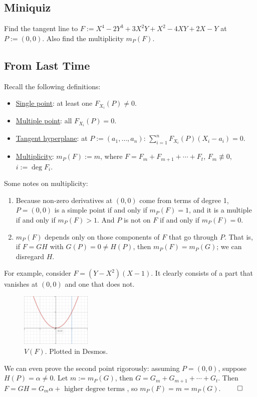 \documentclass[12pt]{article}
\theoremstyle{definition}
\begin{document}
\subsection{Miniquiz}
Find the tangent line to $F:=X^4-2Y^3+3X^2Y+X^2-4XY+2X-Y$ at $P:=(0,0)$. Also find the multiplicity $m_P(F)$.
\subsection{From Last Time}
Recall the following definitions:
\begin{itemize}
    \item \underline{Single point}: at least one $F_{X_i}(P)\neq0$.
    \item \underline{Multiple point}: all $F_{X_i}(P)=0$.
    \item \underline{Tangent hyperplane}: at $P:=(a_1,\dotsc,a_n)$: $\sum\limits_{i=1}^nF_{X_i}(P)(X_i-a_i)=0$.
    \item \underline{Multiplicity}: $m_P(F):=m$, where $F=F_m+F_{m+1}+\dotsb+F_t$, $F_m\not\equiv0$, $i:=\deg F_i$.
\end{itemize}
Some notes on multiplicity:
\begin{enumerate}
    \item Because non-zero derivatives at $(0,0)$ come from terms of degree 1, $P=(0,0)$ is a simple point if and only if $m_P(F)=1$, and it is a multiple if and only if $m_P(F)>1$. And $P$ is not on $F$ if and only if $m_P(F)=0$.
    \item $m_P(F)$ depends only on those components of $F$ that go through $P$. That is, if $F=GH$ with $G(P)=0\neq H(P)$, then $m_P(F)=m_P(G)$; we can disregard $H$.
\end{enumerate}
For example, consider $F=(Y-X^2)(X-1)$. It clearly consists of a part that vanishes at $(0,0)$ and one that does not.
\begin{figure}[H]
    \centering
    \includegraphics[width=0.3\textwidth]{21.png}
    \caption{$V(F)$. Plotted in Desmos.}
\end{figure}
We can even prove the second point rigorously: assuming $P=(0,0)$, suppose $H(P)=\alpha\neq0$. Let $m:=m_P(G)$, then $G=G_m+G_{m+1}+\dotsb+G_t$. Then $F=GH=G_m\alpha+\text{ higher degree terms }$, so $m_P(F)=m=m_P(G)$. $\qed$
\end{document}
